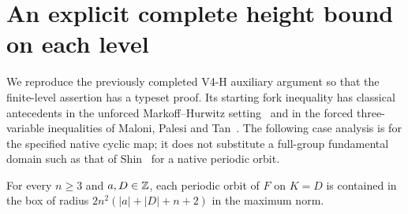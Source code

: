 \section{An explicit complete height bound on each level}
\label{app:height}

We reproduce the previously completed V4-H auxiliary argument so
that the finite-level assertion has a typeset proof. Its starting
fork inequality has classical antecedents in the unforced
Markoff--Hurwitz setting~\cite{huTanZhang2015} and in the forced
three-variable inequalities of Maloni, Palesi and
Tan~\cite{maloniPalesiTan2015}. The following case analysis is for
the specified native cyclic map; it does not substitute a full-group
fundamental domain such as that of Shin~\cite{shin2023} for a
native periodic orbit.

\begin{proposition}
\label{prop:height}
For every $n\ge3$ and $a,D\in\mathbb Z$, each periodic orbit of $F$ on
$K=D$ is contained in the box of radius
$2n^2(|a|+|D|+n+2)$ in the maximum norm.
\end{proposition}
